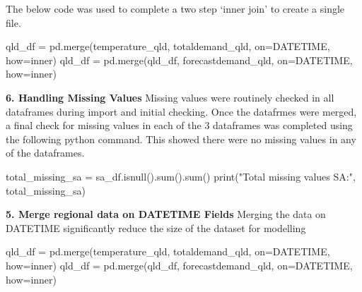 \documentclass[
]{article}
\newenvironment{Shaded}{}{}
\newcommand{\BuiltInTok}[1]{\textcolor[rgb]{0.00,0.50,0.00}{#1}}
\newcommand{\NormalTok}[1]{#1}
\newcommand{\OperatorTok}[1]{\textcolor[rgb]{0.40,0.40,0.40}{#1}}
\newcommand{\StringTok}[1]{\textcolor[rgb]{0.25,0.44,0.63}{#1}}
\begin{document}
The below code was used to complete a two step `inner join' to create a
single file.

\begin{Shaded}
\begin{Highlighting}[]
\NormalTok{qld\_df }\OperatorTok{=}\NormalTok{ pd.merge(temperature\_qld, totaldemand\_qld, on}\OperatorTok{=}\StringTok{\textquotesingle{}DATETIME\textquotesingle{}}\NormalTok{, how}\OperatorTok{=}\StringTok{\textquotesingle{}inner\textquotesingle{}}\NormalTok{)}
\NormalTok{qld\_df }\OperatorTok{=}\NormalTok{ pd.merge(qld\_df, forecastdemand\_qld, on}\OperatorTok{=}\StringTok{\textquotesingle{}DATETIME\textquotesingle{}}\NormalTok{, how}\OperatorTok{=}\StringTok{\textquotesingle{}inner\textquotesingle{}}\NormalTok{)}
\end{Highlighting}
\end{Shaded}

\textbf{6. Handling Missing Values} Missing values were routinely
checked in all dataframes during import and initial checking. Once the
datafrmes were merged, a final check for missing values in each of the 3
dataframes was completed using the following python command. This showed
there were no missing values in any of the dataframes.

\begin{Shaded}
\begin{Highlighting}[]
\NormalTok{total\_missing\_sa }\OperatorTok{=}\NormalTok{ sa\_df.isnull().}\BuiltInTok{sum}\NormalTok{().}\BuiltInTok{sum}\NormalTok{()}
\BuiltInTok{print}\NormalTok{(}\StringTok{"Total missing values SA:"}\NormalTok{, total\_missing\_sa)}
\end{Highlighting}
\end{Shaded}

\textbf{5. Merge regional data on DATETIME Fields} Merging the data on
DATETIME significantly reduce the size of the dataset for modelling

\begin{Shaded}
\begin{Highlighting}[]
\NormalTok{qld\_df }\OperatorTok{=}\NormalTok{ pd.merge(temperature\_qld, totaldemand\_qld, on}\OperatorTok{=}\StringTok{\textquotesingle{}DATETIME\textquotesingle{}}\NormalTok{, how}\OperatorTok{=}\StringTok{\textquotesingle{}inner\textquotesingle{}}\NormalTok{)}
\NormalTok{qld\_df }\OperatorTok{=}\NormalTok{ pd.merge(qld\_df, forecastdemand\_qld, on}\OperatorTok{=}\StringTok{\textquotesingle{}DATETIME\textquotesingle{}}\NormalTok{, how}\OperatorTok{=}\StringTok{\textquotesingle{}inner\textquotesingle{}}\NormalTok{)}
\end{Highlighting}
\end{Shaded}
\end{document}
